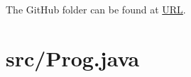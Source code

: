 \documentclass[letterpaper, 11pt]{article}
\title{}
\author{Eli Zupke}
\newcommand{\inputcode}[1]{
	
	\needspace{5em}
	\section{#1}
	
	\vspace{5em}
	\pagebreak[3]
	
}
\begin{document}
\maketitle

The GitHub folder can be found at \url{URL}.

\tableofcontents

\inputcode{src/Prog.java}
\end{document}
